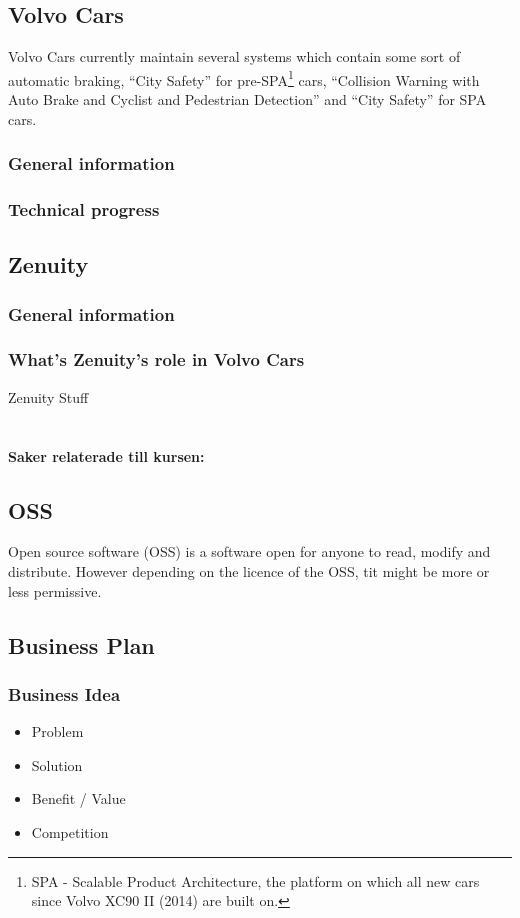 \documentclass[conference]{IEEEtran}
\begin{document}
\subsection{Volvo Cars}
Volvo Cars currently maintain several systems which contain some sort of automatic braking, ``City Safety'' for pre-SPA\footnote{SPA - Scalable Product Architecture, the platform on which all new cars since Volvo XC90 II (2014) are built on.} cars, ``Collision Warning with Auto Brake and Cyclist and Pedestrian Detection'' and ``City Safety'' for SPA cars.\cite{CitySafety,Collision,CitySafety2} 

\subsubsection{General information}
\subsubsection{Technical progress}

\subsection{Zenuity}
\subsubsection{General information}
\subsubsection{What's Zenuity's role in Volvo Cars} 
Zenuity Stuff\\\\
\\\textbf{Saker relaterade till kursen:}
\subsection{OSS}
Open source software (OSS) is a software open for anyone to read, modify and distribute. However depending on the licence of the OSS, tit might be more or less permissive. %

\subsection{Business Plan}
\subsubsection{Business Idea}
\begin{itemize}
	\item Problem
	\item Solution
	\item Benefit / Value
	\item Competition
\end{itemize}
\end{document}
